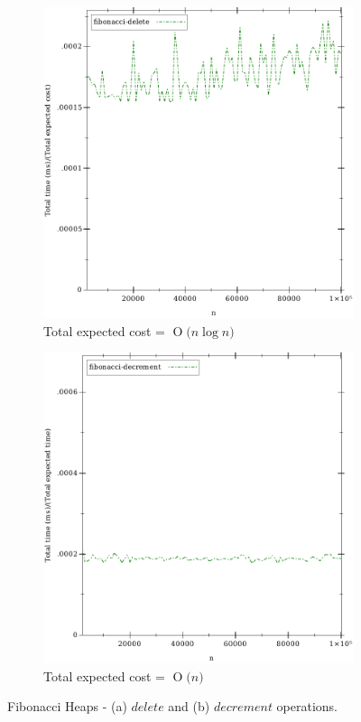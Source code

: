 \documentclass{llncs}
\newcommand{\BigO}[1]{\ensuremath{\operatorname{O}\bigl(#1\bigr)}}
\begin{document}
\begin{figure}
	\begin{subfigure}{0.5\textwidth}
		\centering
		\includegraphics[width=0.8\linewidth]{FIG/fi_delete.pdf}
		\caption{Total expected cost = \BigO{n \log n}} 
		\label{fig:fi_delete}
	\end{subfigure}%
	\begin{subfigure}{0.5\textwidth}
		\centering
		\includegraphics[width=0.8\linewidth]{FIG/fi_decrement.pdf}
		\caption{Total expected cost = \BigO{n}}
		\label{fig:fi_decrement}
	\end{subfigure}
	\caption{Fibonacci Heaps - (a) $delete$ and (b) $decrement$ operations.}
	\label{fig:fi_delete_decrement}
\end{figure}
\end{document}
